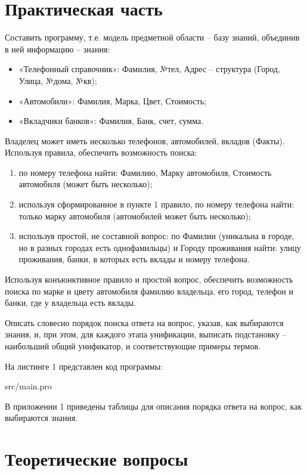 \chapter*{Практическая часть}
Составить программу, т.е. модель предметной области – базу знаний, объединив в ней
информацию – знания:
\begin{itemize}
	\item «Телефонный справочник»: Фамилия, №тел, Адрес – структура (Город,
	Улица, №дома, №кв);
	\item «Автомобили»: Фамилия, Марка, Цвет, Стоимость;
	\item «Вкладчики банков»: Фамилия, Банк, счет, сумма.
\end{itemize}

Владелец может иметь несколько телефонов, автомобилей, вкладов (Факты).
Используя правила, обеспечить возможность поиска:
\begin{enumerate}
	\item по номеру телефона найти: Фамилию, Марку автомобиля, Стоимость автомобиля
	(может быть несколько);
	\item используя сформированное в пункте 1 правило, по номеру телефона найти:
	только марку автомобиля (автомобилей может быть несколько);
	\item используя простой, не составной вопрос: по Фамилии (уникальна в городе, но в
	разных городах есть однофамильцы) и Городу проживания найти: улицу проживания, банки, в которых есть вклады и номеру телефона.
\end{enumerate}

Используя конъюнктивное правило и простой вопрос, обеспечить возможность поиска по марке и цвету автомобиля фамилию владельца, его город, телефон и банки, где у владельца есть вклады.

Описать словесно порядок поиска ответа на вопрос, указав, как выбираются знания, и, при этом, для
каждого этапа унификации, выписать подстановку – наибольший общий унификатор, и соответствующие примеры термов.

На листинге 1 представлен код программы:

\FloatBarrier
\begin{lstinputlisting}[style={lsp}]{src/main.pro}
\end{lstinputlisting}
\FloatBarrier

В приложении 1 приведены таблицы для описания порядка ответа на вопрос, как выбираются знания.

\chapter*{Теоретические вопросы}

